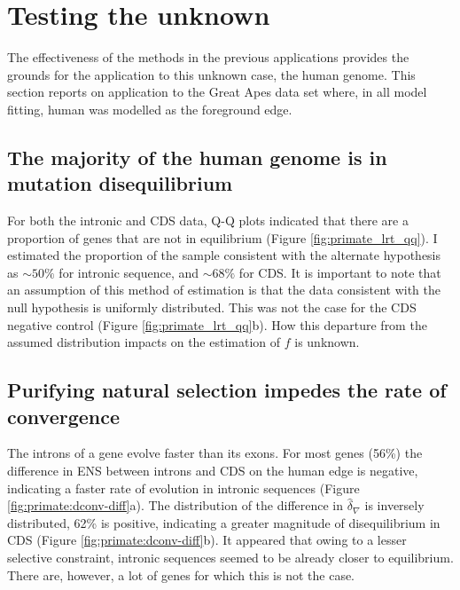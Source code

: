 \section{Testing the unknown}

The effectiveness of the methods in the previous applications provides the grounds for the application to this unknown case, the human genome. This section reports on application to the Great Apes data set where, in all model fitting, human was modelled as the foreground edge. 

\subsection{The majority of the human genome is in mutation disequilibrium}
\label{Human:TOE}
For both the intronic and \acrshort{CDS} data, Q-Q plots indicated that there are a proportion of genes that are not in equilibrium (Figure \ref{fig:primate_lrt_qq}). I estimated the proportion of the sample consistent with the alternate hypothesis as $\sim50\%$ for intronic sequence, and $\sim68\%$ for CDS. It is important to note that an assumption of this method of estimation is that the data consistent with the null hypothesis is uniformly distributed. This was not the case for the CDS negative control (Figure \ref{fig:primate_lrt_qq}b). How this departure from the assumed distribution impacts on the estimation of $f$ is unknown. 



\subsection{Purifying natural selection impedes the rate of convergence}

The introns of a gene evolve faster than its exons. For most genes (56\%) the difference in ENS between introns and CDS on the human edge is negative, indicating a faster rate of evolution in intronic sequences (Figure \ref{fig:primate:dconv-diff}a). The distribution of the difference in $\hat\delta_\nabla$ is inversely distributed, 62\% is positive, indicating a greater magnitude of disequilibrium in CDS (Figure \ref{fig:primate:dconv-diff}b). It appeared that owing to a lesser selective constraint, intronic sequences seemed to be already closer to equilibrium. There are, however, a lot of genes for which this is not the case.



